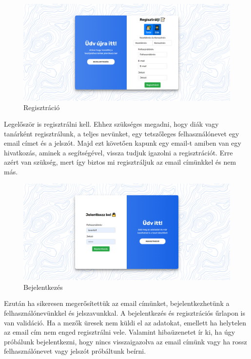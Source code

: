\begin{figure}[H]
    \centering
    \includegraphics[width=\linewidth]{images/signin.png}
    \caption{Regisztráció}
    \label{fig:signin}
\end{figure}


Legelőször is regisztrálni  kell. Ehhez szükséges megadni, hogy diák vagy tanárként regisztrálunk, a teljes nevünket, egy tetszőleges felhasználónevet egy email címet és a jelszót. Majd ezt követően kapunk egy email-t amiben van egy hivatkozás, aminek a segítségével, vissza tudjuk igazolni a regisztrációt. Erre azért van szükség, mert így biztos mi regisztráljuk az email címünkkel és nem más.

\begin{figure}[H]
    \centering
    \includegraphics[width=\linewidth]{images/login.png}
    \caption{Bejelentkezés}
    \label{fig:login}
\end{figure}

Ezután ha sikeresen megerősítettük az email címünket, bejelentkezhetünk  a felhasználónevünkkel és jelszavunkkal.
A bejelentkezés és regisztrációs űrlapon is van validáció. Ha a mezők üresek nem küldi el az adatokat, emellett ha helytelen az email cím nem enged regisztrálni vele. Valamint hibaüzenetet ír ki, ha úgy próbálunk bejelentkezni, hogy nincs visszaigazolva az email címünk vagy ha rossz felhasználónevet vagy jelszót próbáltunk beírni.


